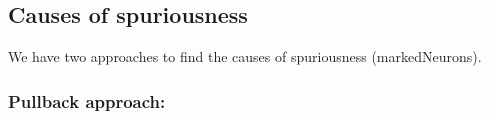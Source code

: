 
\subsection{Causes of spuriousness} 
We have two approaches to find the causes of spuriousness (markedNeurons). 

\subsubsection{Pullback approach: }

